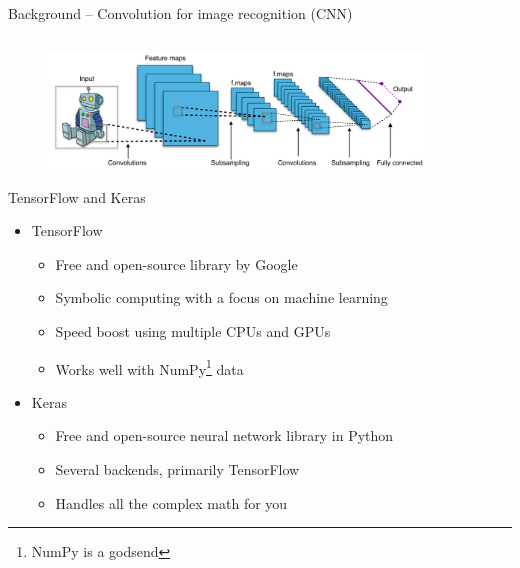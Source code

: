 \documentclass{beamer}
\begin{document}
\begin{frame}{Background -- Convolution for image recognition (CNN)}
\begin{columns}
\begin{column}{0.25\textwidth}
	\end{column}
	\end{columns}
	\begin{figure}
		\includegraphics[width=0.9\textwidth]{cnn}
	\end{figure}
	\end{frame}

	\begin{frame}{TensorFlow and Keras}
	\begin{itemize}
		\item TensorFlow
		\begin{itemize}
			\item Free and open-source library by Google
			\item Symbolic computing with a focus on machine learning
			\item Speed boost using multiple CPUs and GPUs
			\item Works well with NumPy\footnote{NumPy is a godsend} data
		\end{itemize}
		\item Keras
		\begin{itemize}
			\item Free and open-source neural network library in Python
			\item Several backends, primarily TensorFlow
			\item Handles all the complex math for you
		\end{itemize}
	\end{itemize}
	\end{frame}
\end{document}
